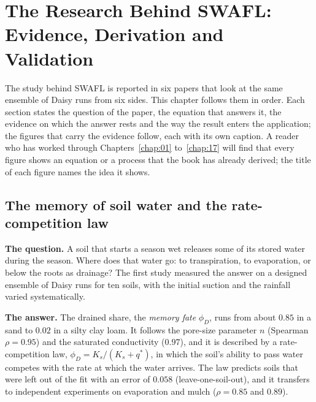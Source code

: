 \chapter{The Research Behind SWAFL: Evidence, Derivation and Validation}\label{chap:22}
The study behind SWAFL is reported in six papers that look at the same ensemble of Daisy runs from six sides. This chapter follows them in order. Each section states the question of the paper, the equation that answers it, the evidence on which the answer rests and the way the result enters the application; the figures that carry the evidence follow, each with its own caption. A reader who has worked through Chapters~\ref{chap:01} to~\ref{chap:17} will find that every figure shows an equation or a process that the book has already derived; the title of each figure names the idea it shows.
\section{The memory of soil water and the rate-competition law}
\textbf{The question.} A soil that starts a season wet releases some of its stored water during the season. Where does that water go: to transpiration, to evaporation, or below the roots as drainage? The first study measured the answer on a designed ensemble of Daisy runs for ten soils, with the initial suction and the rainfall varied systematically.

\par\noindent\textbf{The answer.} The drained share, the \emph{memory fate} $\phi_D$, runs from about $0.85$ in a sand to $0.02$ in a silty clay loam. It follows the pore-size parameter $n$ (Spearman $\rho=0.95$) and the saturated conductivity ($0.97$), and it is described by a rate-competition law, $\phi_D=K_s/(K_s+q^{\ast})$, in which the soil's ability to pass water competes with the rate at which the water arrives. The law predicts soils that were left out of the fit with an error of $0.058$ (leave-one-soil-out), and it transfers to independent experiments on evaporation and mulch ($\rho=0.85$ and $0.89$).

